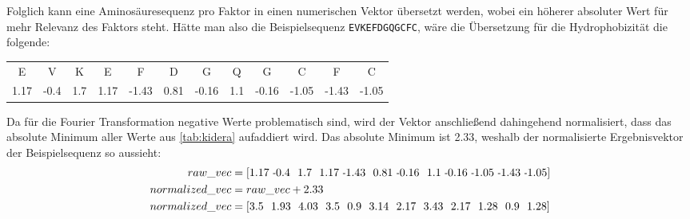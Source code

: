         \newpage
        Folglich kann eine Aminosäuresequenz pro Faktor in einen numerischen Vektor übersetzt werden, wobei ein höherer absoluter Wert für mehr Relevanz des Faktors steht. Hätte man also die Beispielsequenz \texttt{EVKEFDGQGCFC}, wäre die Übersetzung für die Hydrophobizität die folgende:

        \begin{table}[h]
            \centering
            \begin{tabular}{cccccccccccc}
                E & V & K & E & F & D & G & Q & G & C & F & C\\
                1.17 & -0.4 & 1.7 & 1.17 & -1.43 & 0.81 & -0.16 & 1.1 & -0.16 & -1.05 & -1.43 & -1.05
            \end{tabular}
        \end{table}

        Da für die Fourier Transformation negative Werte problematisch sind, wird der Vektor anschließend dahingehend normalisiert, dass das absolute Minimum aller Werte aus \autoref{tab:kidera} aufaddiert wird. Das absolute Minimum ist 2.33, weshalb der normalisierte Ergebnisvektor der Beispielsequenz so aussieht:
        \begin{equation}
            \label{equ:normalization}
            \begin{split}
                raw\_vec & = [1.17\ \sminus0.4\ \ 1.7\ \ 1.17\ \sminus1.43\ \ 0.81\ \sminus0.16\ \ 1.1\ \sminus0.16\ \sminus1.05\ \sminus1.43\ \sminus1.05]\\
                normalized\_vec & = raw\_vec + 2.33\\
                normalized\_vec & = [3.5\ \ 1.93\ \ 4.03\ \ 3.5\ \ 0.9\ \ 3.14\ \ 2.17\ \ 3.43\ \ 2.17\ \ 1.28\ \ 0.9\ \ 1.28]
            \end{split}
        \end{equation}

